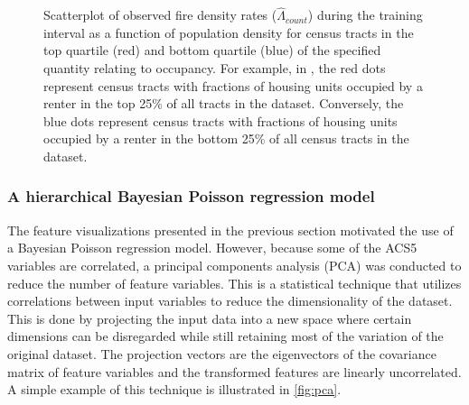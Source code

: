 \documentclass{svjour3}
\begin{document}
\begin{figure}[!ht]
\begin{center}
{          }
      \end{center}
      \caption{Scatterplot of observed fire density rates ($\hat\Lambda_{count}$) during the training interval as a function of population density for census tracts in the top quartile (red) and bottom quartile (blue) of the specified quantity relating to occupancy. For example, in \protect{}, the red dots represent census tracts with fractions of housing units occupied by a renter in the top 25\% of all tracts in the dataset. Conversely, the blue dots represent census tracts with fractions of housing units occupied by a renter in the bottom 25\% of all census tracts in the dataset.}
     \label{fig:occupancy}
  \end{figure}
 
 
 \clearpage
  \subsubsection{A hierarchical Bayesian Poisson regression model}
  The feature visualizations presented in the previous section motivated the use of a Bayesian Poisson regression model. However, because some of the ACS5 variables are correlated, a principal components analysis (PCA) was conducted to reduce the number of feature variables. This is a statistical technique that utilizes correlations between input variables to reduce the dimensionality of the dataset. This is done by projecting the input data into a new space where certain dimensions can be disregarded while still retaining most of the variation of the original dataset. The projection vectors are the eigenvectors of the covariance matrix of feature variables and the transformed features are linearly uncorrelated. A simple example of this technique is illustrated in \ref{fig:pca}.
  
\end{document}
